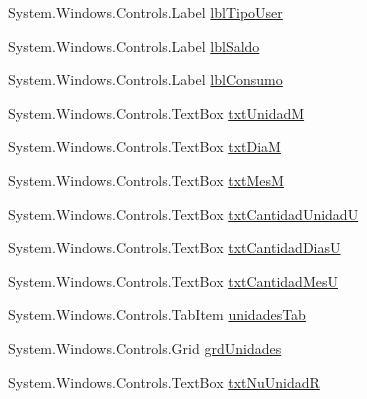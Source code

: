\begin{DoxyCompactItemize}
\item 
System.\-Windows.\-Controls.\-Label \hyperlink{class_proyecto___integrador__3_1_1_reportes_1_1_reporte_frecuencia_de_uso_a44722cad98505b8eaad8df7e5ffcee2c}{lbl\-Tipo\-User}
\item 
System.\-Windows.\-Controls.\-Label \hyperlink{class_proyecto___integrador__3_1_1_reportes_1_1_reporte_frecuencia_de_uso_a6cd14267e6c8f8bd3ad6396122576187}{lbl\-Saldo}
\item 
System.\-Windows.\-Controls.\-Label \hyperlink{class_proyecto___integrador__3_1_1_reportes_1_1_reporte_frecuencia_de_uso_aad6d42ec1def08d2c9851f5952be9428}{lbl\-Consumo}
\item 
System.\-Windows.\-Controls.\-Text\-Box \hyperlink{class_proyecto___integrador__3_1_1_reportes_1_1_reporte_frecuencia_de_uso_a5f1eb7192932de54000a607fd13e1c00}{txt\-Unidad\-M}
\item 
System.\-Windows.\-Controls.\-Text\-Box \hyperlink{class_proyecto___integrador__3_1_1_reportes_1_1_reporte_frecuencia_de_uso_af8bd143e56528392c10ffa7c3cd6d107}{txt\-Dia\-M}
\item 
System.\-Windows.\-Controls.\-Text\-Box \hyperlink{class_proyecto___integrador__3_1_1_reportes_1_1_reporte_frecuencia_de_uso_a09866a06c2de29cae45eec70baaa743c}{txt\-Mes\-M}
\item 
System.\-Windows.\-Controls.\-Text\-Box \hyperlink{class_proyecto___integrador__3_1_1_reportes_1_1_reporte_frecuencia_de_uso_ad46d30c5b21fe0ba956859aeb8af08b3}{txt\-Cantidad\-Unidad\-U}
\item 
System.\-Windows.\-Controls.\-Text\-Box \hyperlink{class_proyecto___integrador__3_1_1_reportes_1_1_reporte_frecuencia_de_uso_a939dae08740f0d01990fe4ceea680731}{txt\-Cantidad\-Dias\-U}
\item 
System.\-Windows.\-Controls.\-Text\-Box \hyperlink{class_proyecto___integrador__3_1_1_reportes_1_1_reporte_frecuencia_de_uso_a8132ea90b7430a179c01f1c6e3216d0c}{txt\-Cantidad\-Mes\-U}
\item 
System.\-Windows.\-Controls.\-Tab\-Item \hyperlink{class_proyecto___integrador__3_1_1_reportes_1_1_reporte_frecuencia_de_uso_a583dbbaea246bdc1979eb787c835d116}{unidades\-Tab}
\item 
System.\-Windows.\-Controls.\-Grid \hyperlink{class_proyecto___integrador__3_1_1_reportes_1_1_reporte_frecuencia_de_uso_a0054ea7e45426e7bc4779c6d4e3144b8}{grd\-Unidades}
\item 
System.\-Windows.\-Controls.\-Text\-Box \hyperlink{class_proyecto___integrador__3_1_1_reportes_1_1_reporte_frecuencia_de_uso_ad3104fe9d62ad8d1d810606d9b182b9c}{txt\-Nu\-Unidad\-R}

\end{DoxyCompactItemize}
